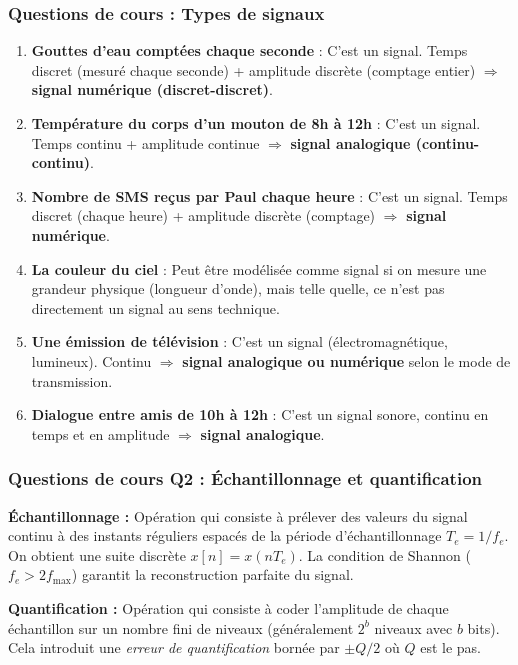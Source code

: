 \documentclass[12pt,a4paper]{article}
\begin{document}
\subsubsection*{Questions de cours : Types de signaux}

\begin{tcolorbox}[corrbox, title=Réponses Q1 -- Identification des signaux]
\begin{enumerate}[label=\alph*)]
  \item \textbf{Gouttes d'eau comptées chaque seconde} : C'est un signal. Temps discret (mesuré chaque seconde) + amplitude discrète (comptage entier) $\Rightarrow$ \textbf{signal numérique (discret-discret)}.
  \item \textbf{Température du corps d'un mouton de 8h à 12h} : C'est un signal. Temps continu + amplitude continue $\Rightarrow$ \textbf{signal analogique (continu-continu)}.
  \item \textbf{Nombre de SMS reçus par Paul chaque heure} : C'est un signal. Temps discret (chaque heure) + amplitude discrète (comptage) $\Rightarrow$ \textbf{signal numérique}.
  \item \textbf{La couleur du ciel} : Peut être modélisée comme signal si on mesure une grandeur physique (longueur d'onde), mais telle quelle, ce n'est pas directement un signal au sens technique.
  \item \textbf{Une émission de télévision} : C'est un signal (électromagnétique, lumineux). Continu $\Rightarrow$ \textbf{signal analogique ou numérique} selon le mode de transmission.
  \item \textbf{Dialogue entre amis de 10h à 12h} : C'est un signal sonore, continu en temps et en amplitude $\Rightarrow$ \textbf{signal analogique}.
\end{enumerate}
\end{tcolorbox}

\subsubsection*{Questions de cours Q2 : Échantillonnage et quantification}

\begin{tcolorbox}[corrbox, title=Réponse Q2]
\textbf{Échantillonnage :} Opération qui consiste à prélever des valeurs du signal continu
à des instants réguliers espacés de la période d'échantillonnage $T_e = 1/f_e$.
On obtient une suite discrète $x[n] = x(nT_e)$. La condition de Shannon ($f_e > 2f_{\max}$)
garantit la reconstruction parfaite du signal.

\medskip
\textbf{Quantification :} Opération qui consiste à coder l'amplitude de chaque échantillon
sur un nombre fini de niveaux (généralement $2^b$ niveaux avec $b$ bits).
Cela introduit une \textit{erreur de quantification} bornée par $\pm Q/2$ où $Q$ est le pas.
\end{tcolorbox}
\end{document}
